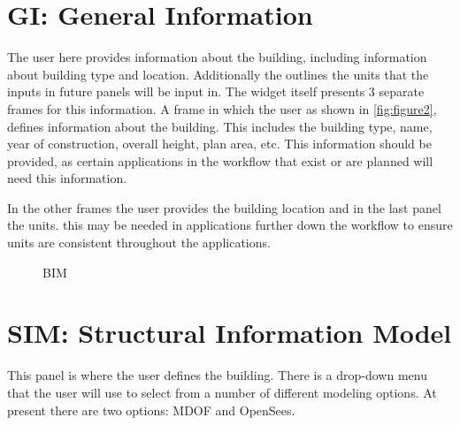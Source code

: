 \section{GI: General Information}
The user here provides information about the building, including information about building type and location. Additionally the outlines the units that the inputs in future panels will be input in. The widget itself presents 3 separate frames for this information. A frame in which the user as shown in \autoref{fig:figure2}, 
defines information about the building. This includes the building type, name, year of construction, overall height, plan area, etc. 
This information should be provided, as certain applications in the workflow that exist or are planned will need this information. 

In the other frames the user provides the building location and in the
last panel the units. this may be needed in applications further down
the workflow to ensure units are consistent throughout the
applications.

\begin{figure}[!htbp]
  \caption{BIM}
  \label{fig:figure2}
\end{figure}

\section{SIM: Structural Information Model}

This panel is where the user defines the building. 
There is a drop-down menu that the user will use to select from a number of different modeling options. 
At present there are two options: MDOF and OpenSees.

